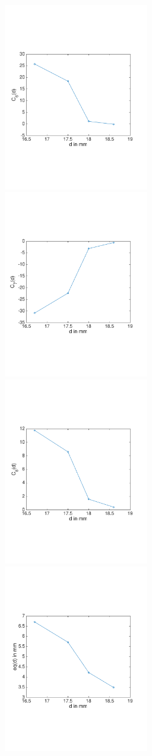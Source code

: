 \documentclass[10pt]{article}
\begin{document}
\begin{figure}[h]
\centering
\includegraphics[width=2.5in]{variationC_6}
\includegraphics[width=2.5in]{variationC_7}
\includegraphics[width=2.5in]{variationC_8}
\includegraphics[width=2.5in]{variationEq}

\end{figure}
\end{document}
